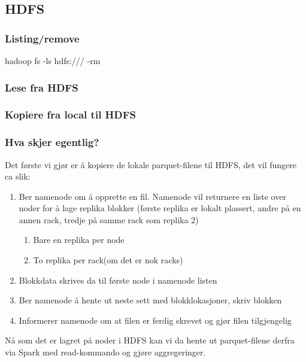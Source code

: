 \subsection{HDFS}
\subsubsection{Listing/remove}
hadoop fs -ls hdfs:///		-rm

\subsubsection{Lese fra HDFS}

\subsubsection{Kopiere fra local til HDFS}


\subsubsection{Hva skjer egentlig?}
Det første vi gjør er å kopiere de lokale parquet-filene til HDFS, det vil fungere ca slik:

\begin{enumerate}
  \item Ber namenode om å opprette en fil. Namenode vil returnere en liste over noder for å lage replika blokker (første replika er lokalt plassert, andre på en annen rack, tredje på samme rack som replika 2)
  \begin{enumerate}
    \item Bare en replika per node 
    \item To replika per rack(om det er nok racks)
  \end{enumerate}
  \item Blokkdata skrives da til første node i namenode listen
  \item Ber namenode å hente ut neste sett med blokklokasjoner, skriv blokken
  \item Informerer namenode om at filen er ferdig skrevet og gjør filen tilgjengelig
\end{enumerate}


Nå som det er lagret på noder i HDFS kan vi da hente ut parquet-filene derfra via Spark med read-kommando og gjøre aggregeringer.

